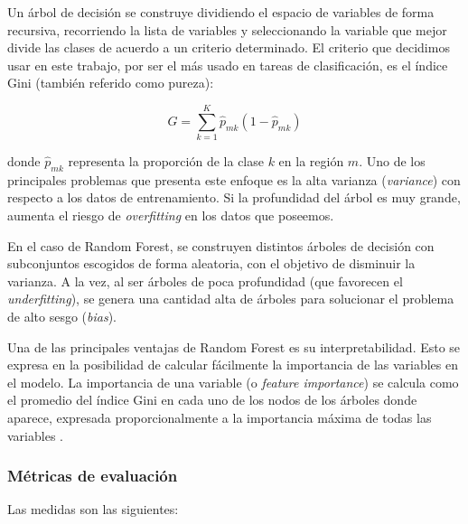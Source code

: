 Un árbol de decisión se construye dividiendo el espacio de variables de forma recursiva, recorriendo la lista de variables y seleccionando la variable que mejor divide las clases de acuerdo a un criterio determinado. El criterio que decidimos usar en este trabajo, por ser el más usado en tareas de clasificación, es el índice Gini (también referido como pureza):

\begin{equation*}
    G = \sum_{k = 1}^{K} \hat{p}_{mk}(1 - \hat{p}_{mk})
\end{equation*}

donde $\hat{p}_{mk}$ representa la proporción de la clase $k$ en la región $m$. Uno de los principales problemas que presenta este enfoque es la alta varianza (\textit{variance}) con respecto a los datos de entrenamiento. Si la profundidad del árbol es muy grande, aumenta el riesgo de \textit{overfitting} en los datos que poseemos. 

En el caso de Random Forest, se construyen distintos árboles de decisión con subconjuntos escogidos de forma aleatoria, con el objetivo de disminuir la varianza. A la vez, al ser árboles de poca profundidad (que favorecen el \textit{underfitting}), se genera una cantidad alta de árboles para solucionar el problema de alto sesgo (\textit{bias}).

Una de las principales ventajas de Random Forest es su interpretabilidad. Esto se expresa en la posibilidad de calcular fácilmente la importancia de las variables en el modelo. La importancia de una variable (o \textit{feature importance}) se calcula como el promedio del índice Gini en cada uno de los nodos de los árboles donde aparece, expresada proporcionalmente a la importancia máxima de todas las variables \cite{Hastie2001}.  



\subsubsection{Métricas de evaluación}

Las medidas son las siguientes:

